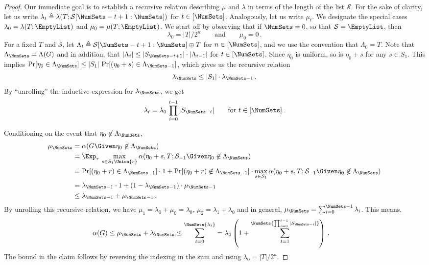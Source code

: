 \begin{proof}
  Our immediate goal is to establish a recursive relation describing $\mu$ and $\lambda$ in terms of 
  the length of the list $\mathcal{S}$. 
  For the sake of clarity, let us write $\lambda_t \triangleq \lambda(T; \mathcal{S}[\NumSets - t + 1:\NumSets])$
  for $t \in [\NumSets]$. Analogously, let us write $\mu_t$. 
  We designate the special cases $\lambda_0 = \lambda(T; \EmptyList)$ and $\mu_0 = \mu(T; \EmptyList)$.
  We start off by observing that if $\NumSets = 0$, so that $\mathcal{S} = \EmptyList$, then
  \[
    \lambda_0 = |T|/2^\kappa \qquad\text{and}\qquad \mu_0 = 0\,.
  \]
  For a fixed $T$ and $\mathcal{S}$, 
  let $\Lambda_t \triangleq \mathcal{S}[\NumSets - t + 1:\NumSets] \oplus T$ for $n \in [\NumSets]$, and 
  we use the convention that $\Lambda_0 = T$.
  Note that $\Lambda_\NumSets = \Lambda(G)$ and in addition, that 
  $|\Lambda_t| \leq |S_{\NumSets - t + 1}| \cdot |\Lambda_{t-1}|$ for $t \in [\NumSets]$. 
  Since $\eta_0$ is uniform, so is $\eta_0 + s$ for any $s \in S_1$.
  This implies $\Pr[\eta_0 \in \Lambda_\NumSets] \leq |S_1|\, \Pr[(\eta_0 + s) \in \Lambda_{\NumSets - 1}]$, 
  which gives us the recursive relation 
  \[
    \lambda_\NumSets \leq |S_1| \cdot \lambda_{\NumSets-1}
    \,.
  \]
  By ``unrolling'' the inductive expression for $\lambda_\NumSets$, 
  we get 
  \[
  \lambda_t 
  = \lambda_0 \, \prod_{i=0}^{t-1}{|S_{\NumSets - i}|} 
  \qquad\text{for $t \in [\NumSets]$}
  \, .
  \] 
  

  Conditioning on the event that $\eta_0 \not \in \Lambda_\NumSets$, 
  \begin{align*}
    \mu_\NumSets
    &= \alpha(G \Given \eta_0 \not \in \Lambda_\NumSets) \\
    &= \Exp_r\, \max_{s \in S_1 \Union\{r\} } \alpha(\eta_0 + s, T; \mathcal{S}_{-1} \Given \eta_0 \not \in \Lambda_\NumSets) \\
    &= \Pr[(\eta_0 + r) \in \Lambda_{\NumSets-1}] \cdot 1 +
    \Pr[(\eta_0 + r) \not \in \Lambda_{\NumSets - 1}] \cdot \max_{s \in S_1 } \alpha(\eta_0 + s, T; \mathcal{S}_{-1} \Given \eta_0 \not \in \Lambda_\NumSets) \\
    &= \lambda_{\NumSets - 1} \cdot 1 + (1 - \lambda_{\NumSets - 1}) \cdot \mu_{\NumSets - 1}\\
    &\leq \lambda_{\NumSets - 1} + \mu_{\NumSets - 1}
    \, .
  \end{align*}
  By unrolling this recursive relation,
  we have $\mu_1 = \lambda_0 + \mu_0 = \lambda_0$, $\mu_2 = \lambda_1 + \lambda_0$ 
  and in general, $\mu_\NumSets = \sum_{i=0}^{\NumSets-1}{\lambda_i}$. 
  This means, 
  \begin{align*}
    \alpha(G) &\leq \mu_\NumSets + \lambda_\NumSets 
    \leq \sum_{t=0}^\NumSets{ \lambda_t } 
    = \lambda_0 \left( 1 + \sum_{t=1}^\NumSets{ \prod_{i=0}^{t-1}{|S_{\NumSets - i}|} } \right) 
    \,.
  \end{align*}
 The bound in the claim follows by reversing the indexing in the sum and using $\lambda_0 = |T|/2^\kappa$.
\end{proof}
